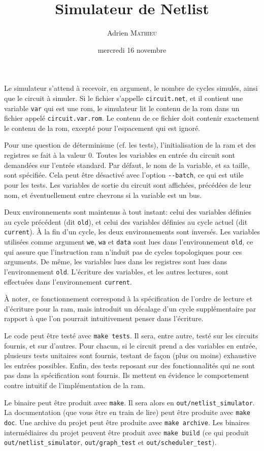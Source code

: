 \documentclass{scrartcl}
\title{Simulateur de Netlist}
\author{Adrien \textsc{Mathieu}}
\date{mercredi 16 novembre}
\begin{document}
\maketitle

Le simulateur s'attend à recevoir, en argument, le nombre de cycles simulés,
ainsi que le circuit à simuler. Si le fichier s'appelle \verb|circuit.net|, et il
contient une variable \verb|var| qui est une rom, le simulateur lit le contenu de
la rom dans un fichier appelé \verb|circuit.var.rom|. Le contenu de ce fichier
doit contenir exactement le contenu de la rom, excepté pour l'espacement qui est
ignoré.\par
Pour une question de déterminisme (cf. les tests), l'initialisation de la ram et
des registres se fait à la valeur $0$. Toutes les variables en entrée du circuit
sont demandées sur l'entrée standard. Par défaut, le nom de la variable, et sa
taille, sont spécifiée. Cela peut être désactivé avec l'option \verb|--batch|,
ce qui est utile pour les tests. Les variables de sortie du circuit sont
affichées, précédées de leur nom, et éventuellement entre chevrons si la variable
est un bus.\par
Deux environnements sont maintenus à tout instant: celui des variables définies
au cycle précédent (dit \verb|old|), et celui des variables définies au cycle
actuel (dit \verb|current|). À la fin d'un cycle, les deux environnements sont
inversés. Les variables utilisées comme argument \verb|we|, \verb|wa| et
\verb|data| sont lues dans l'environnement \verb|old|, ce qui assure que
l'instruction ram n'induit pas de cycles topologiques pour ces arguments. De
même, les variables lues dans les registres sont lues dans l'environnement
\verb|old|. L'écriture des variables, et les autres lectures, sont effectuées
dans l'environnement \verb|current|.\par
À noter, ce fonctionnement correspond à la spécification de l'ordre de lecture
et d'écriture pour la ram, mais introduit un décalage d'un cycle supplémentaire
par rapport à que l'on pourrait intuitivement penser dans l'écriture.\par
Le code peut être testé avec \verb|make tests|. Il sera, entre autre, testé sur
les circuits fournis, et sur d'autres. Pour chacun, si le circuit prend a des
variables en entrée, plusieurs tests unitaires sont fournis, testant de façon
(plus ou moins) exhaustive les entrées possibles. Enfin, des tests reposant sur
des fonctionnalités qui ne sont pas dans la spécification sont fournis. Ils
mettent en évidence le comportement contre intuitif de l'implémentation de la
ram.\par
Le binaire peut être produit avec \verb|make|. Il sera alors en
\verb|out/netlist_simulator|. La documentation (que vous être en train de lire)
peut être produite avec \verb|make doc|. Une archive du projet peut être produite
avec \verb|make archive|. Les binaires intermédiaires du projet peuvent être
produit avec \verb|make build| (ce qui produit \verb|out/netlist_simulator|,
\verb|out/graph_test| et \verb|out/scheduler_test|).
\end{document}
